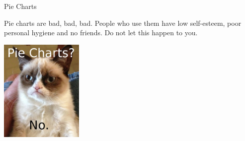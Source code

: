\begin{frame}{Pie Charts}

  Pie charts are bad, bad, bad. People who use them have low
  self-esteem, poor personal hygiene and no friends. Do not let this
  happen to you.

  \vfill

  \centerline{\includegraphics[width=4cm]{img/grumpyPieChart}}

  
\end{frame}

